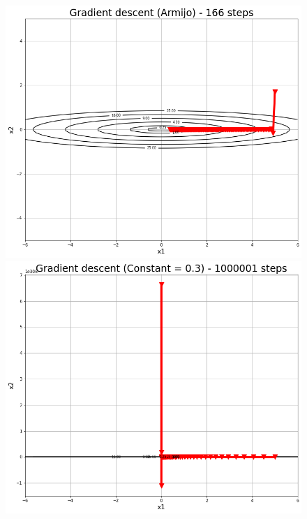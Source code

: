 \documentclass[14pt]{article}
\begin{document}
\begin{figure}[h]
\centering
	\includegraphics[height=0.256\paperheight]{deform_armijo.png}
	\includegraphics[height=0.256\paperheight]{deform_const.png}

\end{figure}
\end{document}
